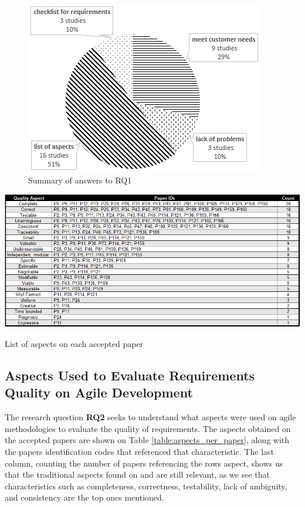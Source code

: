 \begin{figure}[!h]
\centering
\includegraphics[scale=1]{images/3_answers_rq1}
\caption{Summary of answers to RQ1}
\label{fig:answers_rq1}
\end{figure}

\begin{table}[!t]
\centering
\includegraphics[scale=0.65]{images/QualityAspect_ListOfPapers}
\caption{List of aspects on each accepted paper}
\label{table:aspects_per_paper}
\end{table}

\subsection{Aspects Used to Evaluate Requirements Quality on Agile Development}

The research question \textbf{RQ2} seeks to understand what aspects were used on agile methodologies to evaluate the quality of requirements. The aspects obtained on the accepted papers are shown on Table \ref{table:aspects_per_paper}, along with the papers identification codes that referenced that characteristic. The last column, counting the number of papers referencing the rows aspect, shows us that the traditional aspects found on \cite{Babok_2015} and \cite{Babok_2009} are still relevant, as we see that characteristics such as completeness, correctness, testability, lack of ambiguity, and consistency are the top ones mentioned.

